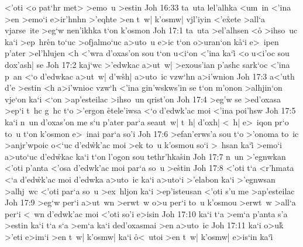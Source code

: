 <'oti
<o
pat`hr
met>
>emo~u
>estin\bibvsend
\vs Joh 16:33
ta~uta
lel'alhka
<um~in
<'ina
>en
>emo`i
e>ir'hnhn
>'eqhte
>en
t~w|
k'osmw|
vjl'iyin
<'e\r{x}ete
>all`a
vjarse~ite
>eg`w
nen'ikhka
t`on
k'osmon\bibvsend
\vs Joh 17:1
ta~uta
>el'alhsen
<o\r{}
>ihso~uc
ka`i
>ep~hr\r{e}n
to`uc
>ofjalmo`uc
a>uto~u
e>ic
t`on
o>uran`on
k\r{a}`i
e>~ipen
p'ater
>el'hlujen
<h
<'wra
d'oxas'on
sou
t`on
u<i`on
<'ina
ka`i\r{}
<o
u<i'oc
sou
dox'ash|
se\bibvsend
\vs Joh 17:2
kaj`wc
>'edwkac
a>ut~w|
>exous'ian
p'ashc
sark`oc
<'ina
p~an
<`o
d'edwkac
a>ut~w|
d'w\r{s}h|
a>uto~ic
vzw`hn
a>i'wnion\bibvsend
\vs Joh 17:3
a<'uth
d'e
>estin
<h
a>i'wnioc
vzw`h
<'ina
gin'wskws'in
se
t`on
m'onon
>alhjin`on
vje`on
ka`i
<`on
>ap'esteilac
>ihso~un
qrist'on\bibvsend
\vs Joh 17:4
>eg'w
se
>ed'oxasa
>ep`i
t~hc
g~hc
t`o
>'ergon
\r{e}tele'iwsa
<`o
d'edwk'ac
moi
<'ina
poi'hsw\bibvsend
\vs Joh 17:5
ka`i
n~un
d'oxas'on
me
s`u
p'ater
par`a
seaut~w|
t~h|
d'oxh|
<~h|
e>~iqon
pr`o
to~u
t`on
k'osmon
e>~inai
par`a
so'i\bibvsend
\vs Joh 17:6
>efan'erws'a
sou
t`o
>'onoma
to~ic
>anjr'wpoic
o<`uc
d'ed\r{w}k'ac
moi
>ek
to~u
k'osmou
so`i
>~hsan
ka`i\r{}
>emo`i
a>uto`uc
d'ed\r{w}kac
ka`i
t`on
l'ogon
sou
tethr'hka\r{s}in\bibvsend
{}
\vs Joh 17:7
n~un
>'egnwkan
<'oti
p'anta
<'osa
d'edwk'ac
moi
par`a
so~u
>e\r{s}tin\bibvsend
{}
\vs Joh 17:8
<'oti
t`a
<r'hmata
<`a
d'ed\r{w}k'ac
moi
d'edwka
a>uto~ic
ka`i
a>uto`i
>'elabon
ka`i
>'egnwsan
>alhj~wc
<'oti
par`a
so~u
>ex~hljon
ka`i
>ep'isteusan
<'oti
s'u
me
>ap'esteilac\bibvsend
\vs Joh 17:9
>eg`w
per`i
a>ut~wn
>erwt~w
o>u
per`i
to~u
k'osmou
>erwt~w
>all`a
per`i
<~wn
d'edwk'ac
moi
<'oti
so'i
e>isin\bibvsend
\vs Joh 17:10
ka`i
t`a
>em`a
p'anta
s'a
>estin
ka`i
t`a
s`a
>em`a
ka`i
ded'oxasmai
>en
a>uto~ic\bibvsend
\vs Joh 17:11
ka`i
o>uk\r{}
>'eti
e>im`i
>en
t~w|
k'osmw|
ka`i
\r{o}<~utoi
>en
t~w|
k'osmw|
e>is`in
ka`i\r{}
